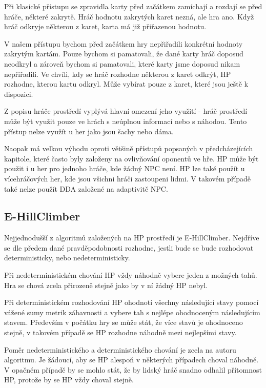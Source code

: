 Při klasické přístupu se zpravidla karty před začátkem zamíchají a rozdají se před hráče, některé zakrytě. Hráč hodnotu zakrytých karet nezná, ale hra ano. Když hráč odkryje některou z karet, karta má již přiřazenou hodnotu. 

V našem přístupu bychom před začátkem hry nepřiřadili konkrétní hodnoty zakrytým kartám. Pouze bychom si pamatovali, že dané karty hráč doposud neodkryl a zároveň bychom si pamatovali, které karty jsme doposud nikam nepřiřadili. Ve chvíli, kdy se hráč rozhodne některou z karet odkrýt, HP rozhodne, kterou kartu odkryl. Může vybírat pouze z karet, které jsou ještě k dispozici.

Z popisu hráče prostředí vyplývá hlavní omezení jeho využití - hráč prostředí může být využit pouze ve hrách s neúplnou informací nebo s náhodou. Tento přístup nelze využít u her jako jsou šachy nebo dáma.

Naopak má velkou výhodu oproti většině přístupů popsaných v předcházejících kapitole, které často byly založeny na ovlivňování oponentů ve hře. HP může být použit i u her pro jednoho hráče, kde žádný NPC není. HP lze také použít u vícehráčových her, kde jsou všichni hráči zastoupeni lidmi. V takovém případě také nelze použít DDA založené na adaptivitě NPC.

\subsection{E-HillClimber}

Nejjednodušší z algoritmů založených na HP prostředí je E-HillClimber. Nejdříve se dle předem dané pravděpodobnosti rozhodne, jestli bude se bude rozhodovat deterministicky, nebo nedeterministicky.

Při nedeterministickém chování HP vždy náhodně vybere jeden z možných tahů. Hra se chová zcela přirozeně stejně jako by v ní žádný HP nebyl.

Při deterministickém rozhodování HP ohodnotí všechny následující stavy pomocí vážené sumy metrik zábavnosti a vybere tah s nejlépe ohodnoceným následujícím stavem. Především v počátku hry se může stát, že více stavů je ohodnoceno stejně, v takovém případě se HP rozhodne náhodně mezi nejlepšími stavy.

Poměr nedeterministického a deterministického chování je zcela na autoru algoritmu. Je žádoucí, aby se HP alespoň v některých případech choval náhodně. V opačném případě by se mohlo stát, že by lidský hráč snadno odhalil přítomnost HP, protože by se HP vždy choval stejně.

